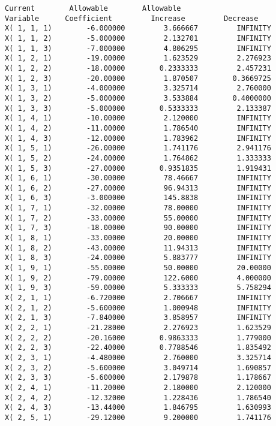 \documentclass[12pt]{article}
\begin{document}
\begin{appendices}
\begin{lstlisting}
Current        Allowable        Allowable
Variable      Coefficient         Increase         Decrease
X( 1, 1, 1)        -6.000000         3.666667         INFINITY
X( 1, 1, 2)        -5.000000         2.132701         INFINITY
X( 1, 1, 3)        -7.000000         4.806295         INFINITY
X( 1, 2, 1)        -19.00000         1.623529         2.276923
X( 1, 2, 2)        -18.00000        0.2333333         2.457231
X( 1, 2, 3)        -20.00000         1.870507        0.3669725
X( 1, 3, 1)        -4.000000         3.325714         2.760000
X( 1, 3, 2)        -5.000000         3.533884        0.4000000
X( 1, 3, 3)        -5.000000        0.5333333         2.133387
X( 1, 4, 1)        -10.00000         2.120000         INFINITY
X( 1, 4, 2)        -11.00000         1.786540         INFINITY
X( 1, 4, 3)        -12.00000         1.783962         INFINITY
X( 1, 5, 1)        -26.00000         1.741176         2.941176
X( 1, 5, 2)        -24.00000         1.764862         1.333333
X( 1, 5, 3)        -27.00000        0.9351835         1.919431
X( 1, 6, 1)        -30.00000         78.46667         INFINITY
X( 1, 6, 2)        -27.00000         96.94313         INFINITY
X( 1, 6, 3)        -3.000000         145.8838         INFINITY
X( 1, 7, 1)        -32.00000         78.00000         INFINITY
X( 1, 7, 2)        -33.00000         55.00000         INFINITY
X( 1, 7, 3)        -18.00000         90.00000         INFINITY
X( 1, 8, 1)        -33.00000         20.00000         INFINITY
X( 1, 8, 2)        -43.00000         11.94313         INFINITY
X( 1, 8, 3)        -24.00000         5.883777         INFINITY
X( 1, 9, 1)        -55.00000         50.00000         20.00000
X( 1, 9, 2)        -79.00000         122.6000         4.000000
X( 1, 9, 3)        -59.00000         5.333333         5.758294
X( 2, 1, 1)        -6.720000         2.706667         INFINITY
X( 2, 1, 2)        -5.600000         1.000948         INFINITY
X( 2, 1, 3)        -7.840000         3.858957         INFINITY
X( 2, 2, 1)        -21.28000         2.276923         1.623529
X( 2, 2, 2)        -20.16000        0.9863333         1.779000
X( 2, 2, 3)        -22.40000        0.7788546         1.835492
X( 2, 3, 1)        -4.480000         2.760000         3.325714
X( 2, 3, 2)        -5.600000         3.049714         1.690857
X( 2, 3, 3)        -5.600000         2.179878         1.178667
X( 2, 4, 1)        -11.20000         2.180000         2.120000
X( 2, 4, 2)        -12.32000         1.228436         1.786540
X( 2, 4, 3)        -13.44000         1.846795         1.630993
X( 2, 5, 1)        -29.12000         9.200000         1.741176

\end{lstlisting}
\end{appendices}
\end{document}
